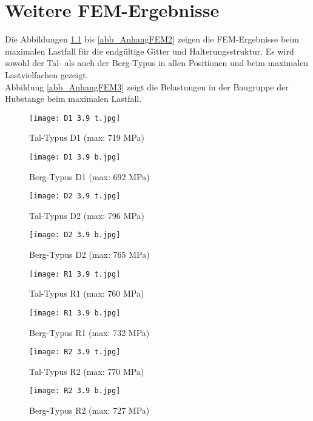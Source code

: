 \chapter{Weitere FEM-Ergebnisse}\label{sec:mehrFEM}
Die Abbildungen \ref{abb_AnhangFEM1} bis \ref{abb_AnhangFEM2} zeigen die FEM-Ergebnisse beim maximalen Lastfall für die endgültige Gitter und Halterungsstruktur. Es wird sowohl der Tal- als auch der Berg-Typus in allen Positionen und beim maximalen Lastvielfachen gezeigt.\\
Abbildung \ref{abb_AnhangFEM3} zeigt die Belastungen in der Baugruppe der Hubstange beim maximalen Lastfall.
\begin{figure}[h]
	\begin{minipage}[t]{0.5\linewidth}
		\centering
		\texttt{[image: D1 3.9 t.jpg]}
		\caption{Tal-Typus D1 (max: 719 MPa)}
		\label{abb_AnhangFEM1}
	\end{minipage}
	\hfill
	\begin{minipage}[t]{0.5\linewidth}
		\centering
		\texttt{[image: D1 3.9 b.jpg]}
		\caption{Berg-Typus D1 (max: 692 MPa)}
	\end{minipage}
\end{figure}
\begin{figure}[h]
\begin{minipage}[t]{0.5\linewidth}
	\centering
	\texttt{[image: D2 3.9 t.jpg]}
	\caption{Tal-Typus D2 (max: 796 MPa)}
\end{minipage}
\hfill
\begin{minipage}[t]{0.5\linewidth}
	\centering
	\texttt{[image: D2 3.9 b.jpg]}
	\caption{Berg-Typus D2 (max: 765 MPa)}
\end{minipage}
\end{figure}
\begin{figure}[h]
\begin{minipage}[t]{0.5\linewidth}
	\centering
	\texttt{[image: R1 3.9 t.jpg]}
	\caption{Tal-Typus R1 (max: 760 MPa)}
\end{minipage}
\hfill
\begin{minipage}[t]{0.5\linewidth}
	\centering
	\texttt{[image: R1 3.9 b.jpg]}
	\caption{Berg-Typus R1 (max: 732 MPa)}
\end{minipage}
\end{figure}
%
%
\begin{figure}[h]
\begin{minipage}[t]{0.5\linewidth}
	\centering
	\texttt{[image: R2 3.9 t.jpg]}
	\caption{Tal-Typus R2 (max: 770 MPa)}
\end{minipage}
\hfill
\begin{minipage}[t]{0.5\linewidth}
	\centering
	\texttt{[image: R2 3.9 b.jpg]}
	\caption{Berg-Typus R2 (max: 727 MPa)}
\end{minipage}
\end{figure}
